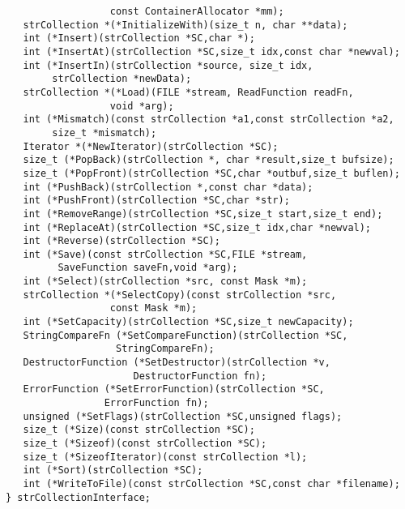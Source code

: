\begin{verbatim}
                  const ContainerAllocator *mm);
   strCollection *(*InitializeWith)(size_t n, char **data);
   int (*Insert)(strCollection *SC,char *);
   int (*InsertAt)(strCollection *SC,size_t idx,const char *newval);
   int (*InsertIn)(strCollection *source, size_t idx,
        strCollection *newData);
   strCollection *(*Load)(FILE *stream, ReadFunction readFn,
                  void *arg);
   int (*Mismatch)(const strCollection *a1,const strCollection *a2,
        size_t *mismatch);
   Iterator *(*NewIterator)(strCollection *SC);
   size_t (*PopBack)(strCollection *, char *result,size_t bufsize);
   size_t (*PopFront)(strCollection *SC,char *outbuf,size_t buflen);
   int (*PushBack)(strCollection *,const char *data);
   int (*PushFront)(strCollection *SC,char *str);
   int (*RemoveRange)(strCollection *SC,size_t start,size_t end);
   int (*ReplaceAt)(strCollection *SC,size_t idx,char *newval);
   int (*Reverse)(strCollection *SC);
   int (*Save)(const strCollection *SC,FILE *stream,
         SaveFunction saveFn,void *arg);
   int (*Select)(strCollection *src, const Mask *m);
   strCollection *(*SelectCopy)(const strCollection *src,
                  const Mask *m);
   int (*SetCapacity)(strCollection *SC,size_t newCapacity);
   StringCompareFn (*SetCompareFunction)(strCollection *SC,
                   StringCompareFn);
   DestructorFunction (*SetDestructor)(strCollection *v,
                      DestructorFunction fn);
   ErrorFunction (*SetErrorFunction)(strCollection *SC,
                 ErrorFunction fn);
   unsigned (*SetFlags)(strCollection *SC,unsigned flags);
   size_t (*Size)(const strCollection *SC);
   size_t (*Sizeof)(const strCollection *SC);
   size_t (*SizeofIterator)(const strCollection *l);
   int (*Sort)(strCollection *SC);
   int (*WriteToFile)(const strCollection *SC,const char *filename);
} strCollectionInterface;
\end{verbatim}
